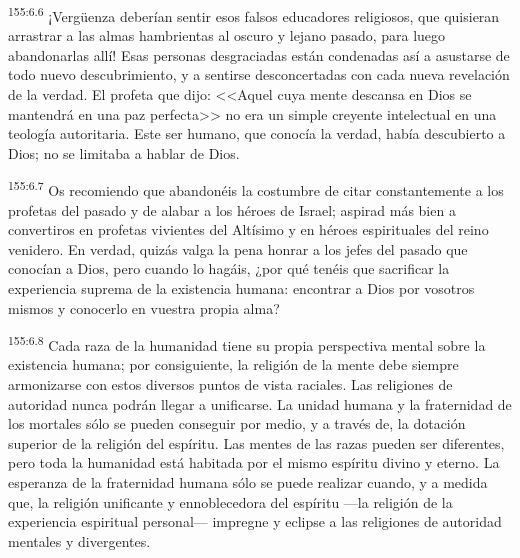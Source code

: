 \par 
\textsuperscript{155:6.6} ¡Verg\"uenza deberían sentir esos falsos educadores religiosos, que quisieran arrastrar a las almas hambrientas al oscuro y lejano pasado, para luego abandonarlas allí! Esas personas desgraciadas están condenadas así a asustarse de todo nuevo descubrimiento, y a sentirse desconcertadas con cada nueva revelación de la verdad. El profeta que dijo: <<Aquel cuya mente descansa en Dios se mantendrá en una paz perfecta>> no era un simple creyente intelectual en una teología autoritaria. Este ser humano, que conocía la verdad, había descubierto a Dios; no se limitaba a hablar de Dios.

\par 
\textsuperscript{155:6.7} Os recomiendo que abandonéis la costumbre de citar constantemente a los profetas del pasado y de alabar a los héroes de Israel; aspirad más bien a convertiros en profetas vivientes del Altísimo y en héroes espirituales del reino venidero. En verdad, quizás valga la pena honrar a los jefes del pasado que conocían a Dios, pero cuando lo hagáis, ¿por qué tenéis que sacrificar la experiencia suprema de la existencia humana: encontrar a Dios por vosotros mismos y conocerlo en vuestra propia alma?

\par 
\textsuperscript{155:6.8} Cada raza de la humanidad tiene su propia perspectiva mental sobre la existencia humana; por consiguiente, la religión de la mente debe siempre armonizarse con estos diversos puntos de vista raciales. Las religiones de autoridad nunca podrán llegar a unificarse. La unidad humana y la fraternidad de los mortales sólo se pueden conseguir por medio, y a través de, la dotación superior de la religión del espíritu. Las mentes de las razas pueden ser diferentes, pero toda la humanidad está habitada por el mismo espíritu divino y eterno. La esperanza de la fraternidad humana sólo se puede realizar cuando, y a medida que, la religión unificante y ennoblecedora del espíritu ---la religión de la experiencia espiritual personal--- impregne y eclipse a las religiones de autoridad mentales y divergentes.


